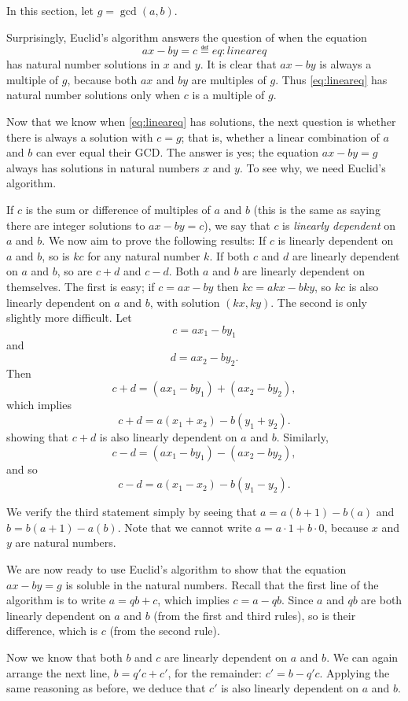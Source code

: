 In this section, let $g=\gcd(a,b).$

Surprisingly, Euclid's algorithm answers the question of when the equation
$$ax-by=c\eqdef{eq:lineareq}$$ has natural number solutions in $x$ and $y$. It is clear that $ax-by$
is always a multiple of $g$, because both $ax$ and $by$ are multiples of $g$.
Thus \eqref{eq:lineareq} has natural number solutions only when $c$ is a multiple of $g$.

Now that we know when \eqref{eq:lineareq} has solutions, the next question is whether
there is always a solution with $c=g$; that is, whether a linear combination of $a$ and $b$
can ever equal their GCD. The answer is yes; the equation $ax-by=g$ always has solutions
in natural numbers $x$ and $y$. To see why, we need Euclid's algorithm.

If $c$ is the sum or difference of multiples of $a$ and $b$ (this is the same
as saying there are integer solutions to $ax-by=c$), we say that $c$
is {\it linearly dependent} on $a$ and $b$. We now aim to prove the following results:
\numberedlist
\li If $c$ is linearly dependent on $a$ and $b$, so is $kc$ for any natural number $k$.
\li If both $c$ and $d$ are linearly dependent on $a$ and $b$, so are $c+d$ and $c-d$.
\li Both $a$ and $b$ are linearly dependent on themselves.
\endnumberedlist
The first is easy; if $c=ax-by$ then $kc=akx-bky$, so $kc$ is also linearly dependent
on $a$ and $b$, with solution $(kx,ky)$. The second is only slightly more difficult. 
Let $$c=ax_1-by_1$$ and $$d=ax_2-by_2.$$ Then $$c+ d=(ax_1-by_1)+ (ax_2-by_2),$$
which implies $$c+d=a(x_1+x_2)-b(y_1+y_2).$$ showing that $c+d$ is also linearly dependent
on $a$ and $b$. Similarly, $$c-d=(ax_1-by_1)-(ax_2-by_2), $$ and so $$c-d=a(x_1-x_2)-b(y_1-y_2).$$

We verify the third statement simply by seeing that $a=a(b+1)-b(a)$ and $b=b(a+1)-a(b)$. 
Note that we cannot write $a=a\cdot1+b\cdot0$, because $x$ and $y$
are natural numbers.

We are now ready to use Euclid's algorithm to show that the equation $ax-by=g$ is soluble
in the natural numbers.
Recall that the first line of the algorithm is to write $a=qb+c$, which implies $c=a-qb.$
Since $a$ and $qb$ are both linearly dependent on $a$ and $b$ (from the first and third rules), so
is their difference, which is $c$ (from the second rule). 

Now we know that both $b$ and $c$ are linearly dependent
on $a$ and $b$. We can again arrange the next line, $b=q'c+c'$, for the remainder: $c'=b-q'c$.
Applying the same reasoning as before, we deduce that $c'$ is also linearly dependent on $a$ and $b$.


